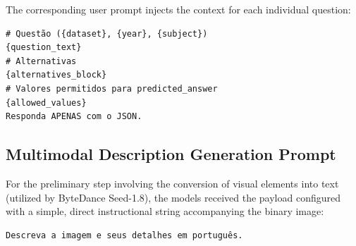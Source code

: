\documentclass[12pt]{article}
\begin{document}
The corresponding user prompt injects the context for each individual question:

\begin{verbatim}
# Questão ({dataset}, {year}, {subject})
{question_text}
# Alternativas
{alternatives_block}
# Valores permitidos para predicted_answer
{allowed_values}
Responda APENAS com o JSON.
\end{verbatim}

\subsection*{Multimodal Description Generation Prompt}

For the preliminary step involving the conversion of visual elements into text (utilized by ByteDance Seed-1.8), the models received the payload configured with a simple, direct instructional string accompanying the binary image:
\begin{verbatim}
Descreva a imagem e seus detalhes em português.
\end{verbatim}



\end{document}
